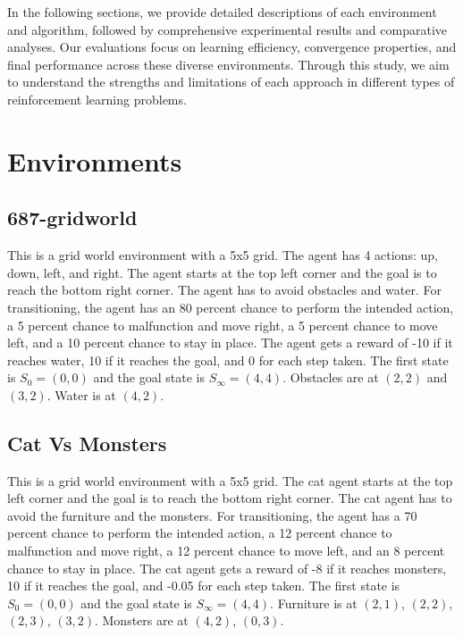 \documentclass{article}
\begin{document}
In the following sections, we provide detailed descriptions of each environment and algorithm, followed by comprehensive experimental results and comparative analyses. Our evaluations focus on learning efficiency, convergence properties, and final performance across these diverse environments. Through this study, we aim to understand the strengths and limitations of each approach in different types of reinforcement learning problems.

\section{Environments}

\subsection{687-gridworld}

This is a grid world environment with a 5x5 grid. The agent has 4 actions: up, down, left, and right.
The agent starts at the top left corner and the goal is to reach the bottom right corner.
The agent has to avoid obstacles and water.
For transitioning, the agent has an 80 percent chance to perform the intended action, a 5 percent chance to malfunction and move right, a 5 percent chance to move left, and a 10 percent chance to stay in place.
The agent gets a reward of -10 if it reaches water, 10 if it reaches the goal, and 0 for each step taken.
The first state is $S_0 = (0,0)$ and the goal state is $S_{\infty} = (4,4)$. Obstacles are at $(2,2)$ and $(3,2)$. Water is at $(4,2)$.

\subsection{Cat Vs Monsters}

This is a grid world environment with a 5x5 grid.
The cat agent starts at the top left corner and the goal is to reach the bottom right corner.
The cat agent has to avoid the furniture and the monsters. For transitioning, the agent has a 70 percent chance to perform the intended action, a 12 percent chance to malfunction and move right, a 12 percent chance to move left, and an 8 percent chance to stay in place.
The cat agent gets a reward of -8 if it reaches monsters, 10 if it reaches the goal, and -0.05 for each step taken.
The first state is $S_0 = (0,0)$ and the goal state is $S_{\infty} = (4,4)$.
Furniture is at $(2,1)$, $(2,2)$, $(2,3)$, $(3,2)$. Monsters are at $(4,2)$, $(0,3)$.
\end{document}
